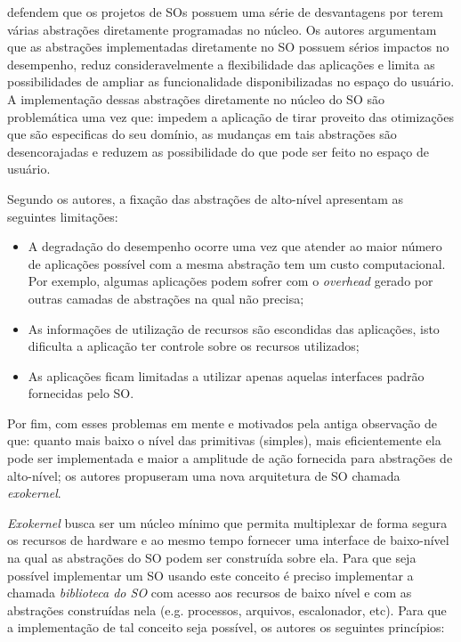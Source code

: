 \citet{exokernel} defendem que os projetos de SOs possuem uma série de
desvantagens por terem várias abstrações diretamente programadas no núcleo. Os
autores argumentam que as abstrações implementadas diretamente no SO possuem
sérios impactos no desempenho, reduz consideravelmente a flexibilidade das
aplicações e limita as possibilidades de ampliar as funcionalidade
disponibilizadas no espaço do usuário. A implementação dessas abstrações
diretamente no núcleo do SO são problemática uma vez que: impedem a aplicação
de tirar proveito das otimizações que são especificas do seu domínio, as
mudanças em tais abstrações são desencorajadas e reduzem as possibilidade do
que pode ser feito no espaço de usuário.

Segundo os autores, a fixação das abstrações de alto-nível apresentam as
seguintes limitações:

\begin{itemize}
  \item A degradação do desempenho ocorre uma vez que atender ao maior número
        de aplicações possível com a mesma abstração tem um custo
        computacional. Por exemplo, algumas aplicações podem sofrer com o
        \emph{overhead} gerado por outras camadas de abstrações na qual não
        precisa;
  \item As informações de utilização de recursos são escondidas das aplicações,
        isto dificulta a aplicação ter controle sobre os recursos utilizados;
  \item As aplicações ficam limitadas a utilizar apenas aquelas interfaces
        padrão fornecidas pelo SO.
\end{itemize}

Por fim, com esses problemas em mente e motivados pela antiga observação de que:
quanto mais baixo o nível das primitivas (simples), mais eficientemente ela
pode ser implementada e maior a amplitude de ação fornecida para abstrações de
alto-nível; os autores propuseram uma nova arquitetura de SO chamada
\emph{exokernel}.

\emph{Exokernel} busca ser um núcleo mínimo que permita multiplexar de forma
segura os recursos de hardware e ao mesmo tempo fornecer uma interface de
baixo-nível na qual as abstrações do SO podem ser construída sobre ela. Para
que seja possível implementar um SO usando este conceito é preciso implementar
a chamada \textit{biblioteca do SO} com acesso aos recursos de baixo nível e
com as abstrações construídas nela (e.g. processos, arquivos, escalonador,
etc). Para que a implementação de tal conceito seja possível, os autores os
seguintes princípios:

